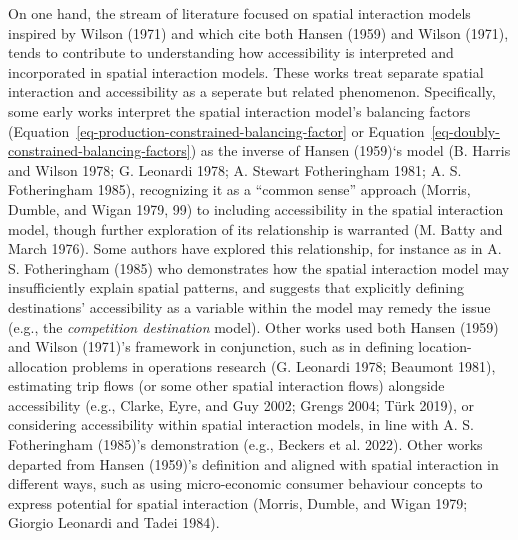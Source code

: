 \documentclass[
]{article}
\begin{document}
On one hand, the stream of literature focused on spatial interaction
models inspired by Wilson (1971) and which cite both Hansen (1959) and
Wilson (1971), tends to contribute to understanding how accessibility is
interpreted and incorporated in spatial interaction models. These works
treat separate spatial interaction and accessibility as a seperate but
related phenomenon. Specifically, some early works interpret the spatial
interaction model's balancing factors
(Equation~\ref{eq-production-constrained-balancing-factor} or
Equation~\ref{eq-doubly-constrained-balancing-factors}) as the inverse
of Hansen (1959)`s model (B. Harris and Wilson 1978; G. Leonardi 1978;
A. Stewart Fotheringham 1981; A. S. Fotheringham 1985), recognizing it
as a ``common sense'' approach (Morris, Dumble, and Wigan 1979, 99) to
including accessibility in the spatial interaction model, though further
exploration of its relationship is warranted (M. Batty and March 1976).
Some authors have explored this relationship, for instance as in A. S.
Fotheringham (1985) who demonstrates how the spatial interaction model
may insufficiently explain spatial patterns, and suggests that
explicitly defining destinations' accessibility as a variable within the
model may remedy the issue (e.g., the \emph{competition destination}
model). Other works used both Hansen (1959) and Wilson (1971)'s
framework in conjunction, such as in defining location-allocation
problems in operations research (G. Leonardi 1978; Beaumont 1981),
estimating trip flows (or some other spatial interaction flows)
alongside accessibility (e.g., Clarke, Eyre, and Guy 2002; Grengs 2004;
Türk 2019), or considering accessibility within spatial interaction
models, in line with A. S. Fotheringham (1985)'s demonstration (e.g.,
Beckers et al. 2022). Other works departed from Hansen (1959)'s
definition and aligned with spatial interaction in different ways, such
as using micro-economic consumer behaviour concepts to express potential
for spatial interaction (Morris, Dumble, and Wigan 1979; Giorgio
Leonardi and Tadei 1984).
\end{document}

